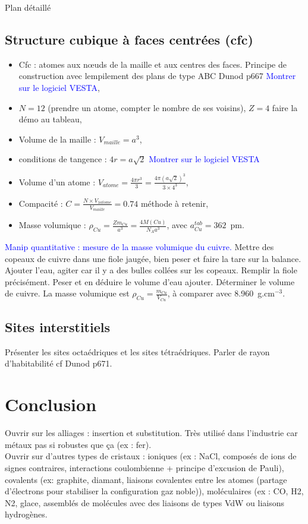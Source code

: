 \begin{reportBlock}{Plan détaillé}
\subsection{Structure cubique à faces centrées (cfc)}
\begin{itemize}
    \item Cfc : atomes aux n\oe uds de la maille et aux centres des faces. Principe de construction avec lempilement des plans de type ABC Dunod p667 \textcolor{blue}{Montrer sur le logiciel VESTA},
    \item $N=12$ (prendre un atome, compter le nombre de ses voisins), $Z=4$ faire la démo au tableau,
    \item Volume de la maille : $V_{maille}=a^3$,
    \item conditions de tangence : $4r = a\sqrt{2}$ \textcolor{blue}{Montrer sur le logiciel VESTA}
    \item Volume d'un atome : $V_{atome}=\frac{4\pi r^3}{3}=\frac{4\pi (a\sqrt{2})^3}{3\times4^3}$,
    \item Compacité : $C=\frac{N\times V_{1atome}}{V_{maille}}=0.74$ méthode à retenir,
    \item Masse volumique : $\rho_{Cu}=\frac{Zm_{Cu}}{a^3}=\frac{4M(Cu)}{N_Aa^3}$, avec $a_{Cu}^{tab}=362$~pm.
\end{itemize}
\textcolor{blue}{Manip quantitative : mesure de la masse volumique du cuivre.} Mettre des copeaux de cuivre dans une fiole jaugée, bien peser et faire la tare sur la balance. Ajouter l'eau, agiter car il y a des bulles collées sur les copeaux. Remplir la fiole précisément. Peser et en déduire le volume d'eau ajouter. Déterminer le volume de cuivre. La masse volumique est $\rho_{Cu}=\frac{m_{Cu}}{V_{Cu}}$, à comparer avec 8.960~g.cm$^{-3}$.\\

\subsection{Sites interstitiels}
Présenter les sites octaédriques et les sites tétraédriques. Parler de rayon d'habitabilité cf Dunod p671.

\section*{Conclusion}
Ouvrir sur les alliages : insertion et substitution. Très utilisé dans l'industrie car métaux pas si robustes que ça (ex : fer).\\

Ouvrir sur d'autres types de cristaux : ioniques (ex : NaCl, composés de ions de signes contraires, interactions coulombienne + principe d'excusion de Pauli), covalents (ex: graphite, diamant, liaisons covalentes entre les atomes (partage d'électrons pour stabiliser la configuration gaz noble)), moléculaires (ex : CO, H2, N2, glace, assemblés de molécules avec des liaisons de types VdW ou liaisons hydrogènes.


\end{reportBlock}


